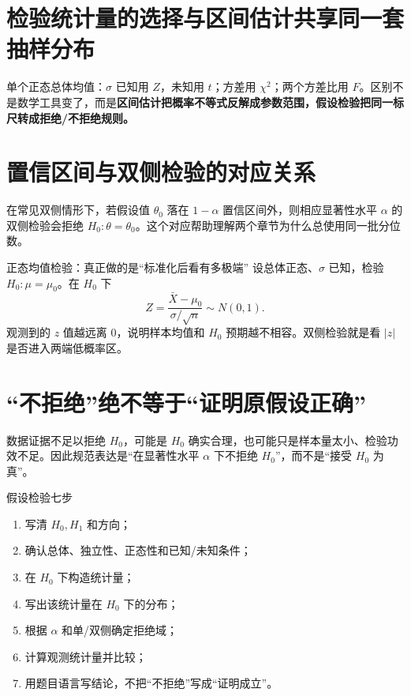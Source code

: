 \documentclass[11pt,a4paper,openany]{ctexbook}
\newcommand{\key}[1]{\textbf{\color{deep}#1}}
\begin{document}
\section{检验统计量的选择与区间估计共享同一套抽样分布}
单个正态总体均值：$\sigma$ 已知用 $Z$，未知用 $t$；方差用 $\chi^2$；两个方差比用 $F$。区别不是数学工具变了，而是\key{区间估计把概率不等式反解成参数范围，假设检验把同一标尺转成拒绝/不拒绝规则。}

\section{置信区间与双侧检验的对应关系}
在常见双侧情形下，若假设值 $\theta_0$ 落在 $1-\alpha$ 置信区间外，则相应显著性水平 $\alpha$ 的双侧检验会拒绝 $H_0:\theta=\theta_0$。这个对应帮助理解两个章节为什么总使用同一批分位数。

\begin{examplebox}{正态均值检验：真正做的是“标准化后看有多极端”}
设总体正态、$\sigma$ 已知，检验 $H_0:\mu=\mu_0$。在 $H_0$ 下
\[
Z=\frac{\bar X-\mu_0}{\sigma/\sqrt n}\sim N(0,1).
\]
观测到的 $z$ 值越远离 0，说明样本均值和 $H_0$ 预期越不相容。双侧检验就是看 $\lvert z\rvert$ 是否进入两端低概率区。
\end{examplebox}

\section{“不拒绝”绝不等于“证明原假设正确”}
数据证据不足以拒绝 $H_0$，可能是 $H_0$ 确实合理，也可能只是样本量太小、检验功效不足。因此规范表达是“在显著性水平 $\alpha$ 下不拒绝 $H_0$”，而不是“接受 $H_0$ 为真”。

\begin{methodbox}{假设检验七步}
\begin{enumerate}
  \item 写清 $H_0,H_1$ 和方向；
  \item 确认总体、独立性、正态性和已知/未知条件；
  \item 在 $H_0$ 下构造统计量；
  \item 写出该统计量在 $H_0$ 下的分布；
  \item 根据 $\alpha$ 和单/双侧确定拒绝域；
  \item 计算观测统计量并比较；
  \item 用题目语言写结论，不把“不拒绝”写成“证明成立”。
\end{enumerate}
\end{methodbox}

\end{document}
